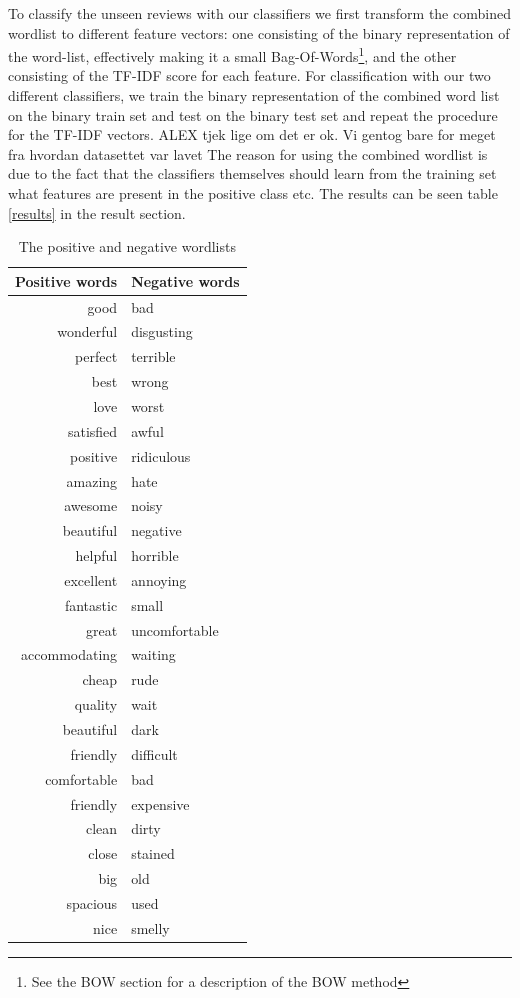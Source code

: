 \documentclass{article}
\begin{document}
To classify the unseen reviews with our classifiers we first transform the combined wordlist to different feature vectors: one consisting of the binary representation of the word-list, effectively making it a small Bag-Of-Words\footnote{See the BOW section for a description of the BOW method}, and the other consisting of the TF-IDF score for each feature. 
For classification with our two different classifiers, we train the binary representation of the combined word list on the binary train set and test on the binary test set and repeat the procedure for the TF-IDF vectors. ALEX tjek lige om det er ok. Vi gentog bare for meget fra hvordan datasettet var lavet
The reason for using the combined wordlist is due to the fact that the classifiers themselves should learn from the training set what features are present in the positive class etc. The results can be seen table \ref{results} in the result section.


\begin{table}[ht!]
\centering
\begin{tabular}{ r | l }
 Positive words & Negative words \\
\hline \hline 
good & bad \\
wonderful & disgusting \\
perfect & terrible \\
best & wrong\\
love & worst\\
satisfied & awful\\
positive & ridiculous\\
amazing & hate\\
awesome & noisy\\
beautiful & negative\\
helpful & horrible\\
excellent & annoying\\
fantastic & small\\
great & uncomfortable\\
accommodating & waiting\\
cheap & rude\\
quality & wait\\
beautiful & dark\\
friendly & difficult\\
comfortable & bad\\
friendly & expensive\\
clean & dirty\\
close & stained\\
big & old\\
spacious & used\\
nice & smelly\\
\hline 
\end{tabular}
\caption{The positive and negative wordlists}
\label{tab:wordlist}
\end{table}
\end{document}
